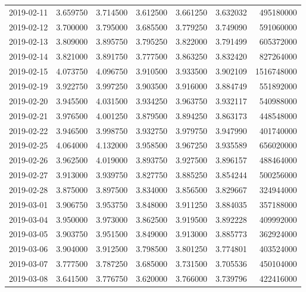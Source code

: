 \begin{tabular}{lrrrrrr}
2019-02-11 &    3.659750 &    3.714500 &    3.612500 &    3.661250 &    3.632032 &   495180000 \\
2019-02-12 &    3.700000 &    3.795000 &    3.685500 &    3.779250 &    3.749090 &   591060000 \\
2019-02-13 &    3.809000 &    3.895750 &    3.795250 &    3.822000 &    3.791499 &   605372000 \\
2019-02-14 &    3.821000 &    3.891750 &    3.777500 &    3.863250 &    3.832420 &   827264000 \\
2019-02-15 &    4.073750 &    4.096750 &    3.910500 &    3.933500 &    3.902109 &  1516748000 \\
2019-02-19 &    3.922750 &    3.997250 &    3.903500 &    3.916000 &    3.884749 &   551892000 \\
2019-02-20 &    3.945500 &    4.031500 &    3.934250 &    3.963750 &    3.932117 &   540988000 \\
2019-02-21 &    3.976500 &    4.001250 &    3.879500 &    3.894250 &    3.863173 &   448548000 \\
2019-02-22 &    3.946500 &    3.998750 &    3.932750 &    3.979750 &    3.947990 &   401740000 \\
2019-02-25 &    4.064000 &    4.132000 &    3.958500 &    3.967250 &    3.935589 &   656020000 \\
2019-02-26 &    3.962500 &    4.019000 &    3.893750 &    3.927500 &    3.896157 &   488464000 \\
2019-02-27 &    3.913000 &    3.939750 &    3.827750 &    3.885250 &    3.854244 &   500256000 \\
2019-02-28 &    3.875000 &    3.897500 &    3.834000 &    3.856500 &    3.829667 &   324944000 \\
2019-03-01 &    3.906750 &    3.953750 &    3.848000 &    3.911250 &    3.884035 &   357188000 \\
2019-03-04 &    3.950000 &    3.973000 &    3.862500 &    3.919500 &    3.892228 &   409992000 \\
2019-03-05 &    3.903750 &    3.951500 &    3.849000 &    3.913000 &    3.885773 &   362924000 \\
2019-03-06 &    3.904000 &    3.912500 &    3.798500 &    3.801250 &    3.774801 &   403524000 \\
2019-03-07 &    3.777500 &    3.787250 &    3.685000 &    3.731500 &    3.705536 &   450104000 \\
2019-03-08 &    3.641500 &    3.776750 &    3.620000 &    3.766000 &    3.739796 &   422416000 \\

\end{tabular}
